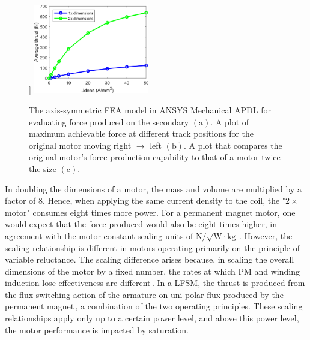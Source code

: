 \begin{figure}[!ht]
                    ]{
                    \includegraphics[width=0.45\textwidth]{chap4/images2/LFSM_scaling_effect.png}
                }
                \caption{ 
                    \label{fig:hap/rsm/LFSM/periodic_fea} The axis-symmetric \acs{FEA} model in ANSYS Mechanical APDL for evaluating force produced on the secondary $\mathrm{(a)}$. 
                    A plot of maximum achievable force at different track positions for
                    the original motor moving right $\rightarrow$ left $\mathrm{(b)}$.
                    A plot that compares the original motor's force production capability to that of a motor twice the size $\mathrm{(c)}$.
                }
            \end{figure}
    
        
            In doubling the dimensions of a motor, the mass and volume are multiplied by a factor of $8$. Hence, when applying the same current density to the coil, the "$2\times$ motor" consumes eight times more power. For a permanent magnet motor, one would expect that the force produced would also be eight times higher, in agreement with the motor constant scaling units of $\mathrm{N/\sqrt{W\cdot kg}}$\,\cite{Ruddy2011DesignMotors}. However, the scaling relationship is different in motors operating primarily on the principle of variable reluctance. The scaling difference arises because, in scaling the overall dimensions of the motor by a fixed number, the rates at which PM and winding induction lose effectiveness are different\,\cite{Melcher1981ContinuumElectromechanics}. In a \acs{LFSM}, the thrust is produced from the flux-switching action of the armature on uni-polar flux produced by the permanent magnet\,\cite{Cheng2011}, a combination of the two operating principles. These scaling relationships apply only up to a certain power level, and above this power level, the motor performance is impacted by saturation.  
    
